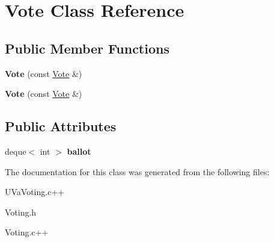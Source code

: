 \hypertarget{classVote}{\section{\-Vote \-Class \-Reference}
\label{classVote}
}
\subsection*{\-Public \-Member \-Functions}
\begin{DoxyCompactItemize}
\item 
\hypertarget{classVote_abe9f4653aa1ebdf674fd5173da7d1da1}{{\bfseries \-Vote} (const \hyperlink{classVote}{\-Vote} \&)}\label{classVote_abe9f4653aa1ebdf674fd5173da7d1da1}

\item 
\hypertarget{classVote_abe9f4653aa1ebdf674fd5173da7d1da1}{{\bfseries \-Vote} (const \hyperlink{classVote}{\-Vote} \&)}\label{classVote_abe9f4653aa1ebdf674fd5173da7d1da1}

\end{DoxyCompactItemize}
\subsection*{\-Public \-Attributes}
\begin{DoxyCompactItemize}
\item 
\hypertarget{classVote_a4adf22cd05dcf2babdfb2886ba814d61}{deque$<$ int $>$ {\bfseries ballot}}\label{classVote_a4adf22cd05dcf2babdfb2886ba814d61}

\end{DoxyCompactItemize}


\-The documentation for this class was generated from the following files\-:\begin{DoxyCompactItemize}
\item 
\-U\-Va\-Voting.\-c++\item 
\-Voting.\-h\item 
\-Voting.\-c++\end{DoxyCompactItemize}
